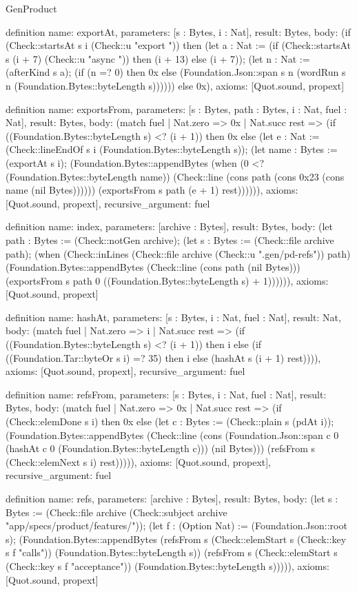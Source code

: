 \begin{lexlean}{GenProduct}
\begin{semanticmodule}
{definition{
  name: exportAt,
  parameters: [s : Bytes, i : Nat],
  result: Bytes,
  body: (if (Check::startsAt s i (Check::u "export ")) then (let a : Nat := (if (Check::startsAt s (i + 7) (Check::u "async ")) then (i + 13) else (i + 7)); (let n : Nat := (afterKind s a); (if (n =? 0) then 0x else (Foundation.Json::span s n (wordRun s n (Foundation.Bytes::byteLength s)))))) else 0x),
  axioms: [Quot.sound, propext]
}

definition{
  name: exportsFrom,
  parameters: [s : Bytes, path : Bytes, i : Nat, fuel : Nat],
  result: Bytes,
  body: (match fuel
    | Nat.zero => 0x
    | Nat.succ rest => (if ((Foundation.Bytes::byteLength s) <? (i + 1)) then 0x else (let e : Nat := (Check::lineEndOf s i (Foundation.Bytes::byteLength s)); (let name : Bytes := (exportAt s i); (Foundation.Bytes::appendBytes (when (0 <? (Foundation.Bytes::byteLength name)) (Check::line (cons path (cons 0x23 (cons name (nil Bytes)))))) (exportsFrom s path (e + 1) rest)))))),
  axioms: [Quot.sound, propext],
  recursive_argument: fuel
}

definition{
  name: index,
  parameters: [archive : Bytes],
  result: Bytes,
  body: (let path : Bytes := (Check::notGen archive); (let s : Bytes := (Check::file archive path); (when (Check::inLines (Check::file archive (Check::u ".gen/pd-refs")) path) (Foundation.Bytes::appendBytes (Check::line (cons path (nil Bytes))) (exportsFrom s path 0 ((Foundation.Bytes::byteLength s) + 1)))))),
  axioms: [Quot.sound, propext]
}

definition{
  name: hashAt,
  parameters: [s : Bytes, i : Nat, fuel : Nat],
  result: Nat,
  body: (match fuel
    | Nat.zero => i
    | Nat.succ rest => (if ((Foundation.Bytes::byteLength s) <? (i + 1)) then i else (if ((Foundation.Tar::byteOr s i) =? 35) then i else (hashAt s (i + 1) rest)))),
  axioms: [Quot.sound, propext],
  recursive_argument: fuel
}

definition{
  name: refsFrom,
  parameters: [s : Bytes, i : Nat, fuel : Nat],
  result: Bytes,
  body: (match fuel
    | Nat.zero => 0x
    | Nat.succ rest => (if (Check::elemDone s i) then 0x else (let c : Bytes := (Check::plain s (pdAt i)); (Foundation.Bytes::appendBytes (Check::line (cons (Foundation.Json::span c 0 (hashAt c 0 (Foundation.Bytes::byteLength c))) (nil Bytes))) (refsFrom s (Check::elemNext s i) rest))))),
  axioms: [Quot.sound, propext],
  recursive_argument: fuel
}

definition{
  name: refs,
  parameters: [archive : Bytes],
  result: Bytes,
  body: (let s : Bytes := (Check::file archive (Check::subject archive "app/specs/product/features/")); (let f : (Option Nat) := (Foundation.Json::root s); (Foundation.Bytes::appendBytes (refsFrom s (Check::elemStart s (Check::key s f "calls")) (Foundation.Bytes::byteLength s)) (refsFrom s (Check::elemStart s (Check::key s f "acceptance")) (Foundation.Bytes::byteLength s))))),
  axioms: [Quot.sound, propext]
}

}
\end{semanticmodule}
\end{lexlean}
